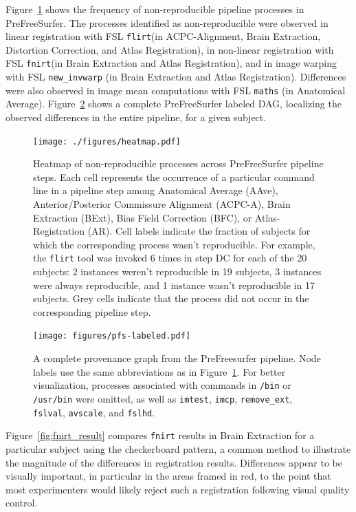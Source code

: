\documentclass[a4paper,num-refs]{oup-contemporary}
\newcommand{\revised}[1]{\color{blue}#1\color{black}\xspace}
\newcommand{\flirt}[0]{\texttt{flirt}\xspace}
\newcommand{\fnirt}[0]{\texttt{fnirt}\xspace}
\begin{document}
Figure~\ref{fig:pfs_heatmap} shows the frequency of non-reproducible pipeline processes
in PreFreeSurfer.
The processes identified as non-reproducible were observed in linear registration
with FSL \flirt (in ACPC-Alignment, Brain Extraction, Distortion Correction, and
Atlas Registration), in non-linear registration with FSL \fnirt (in Brain Extraction
and Atlas Registration), and in image warping with FSL \texttt{new\_invwarp} (in Brain Extraction
and Atlas Registration). Differences were also observed in image mean
computations with FSL \texttt{maths}  (in Anatomical Average).
Figure~\ref{fig:complete_pfs} shows a complete PreFreeSurfer labeled DAG, localizing
the observed differences in the entire pipeline, for a given subject.
\begin{figure}
\centering
  \texttt{[image: ./figures/heatmap.pdf]}
  \caption{Heatmap of non-reproducible processes across PreFreeSurfer pipeline steps.
  Each cell represents the occurrence of a particular command line in a
  pipeline step among Anatomical Average (AAve), Anterior/Posterior
  Commissure Alignment (ACPC-A), Brain Extraction (BExt), Bias Field
  Correction (BFC), or Atlas-Registration (AR). Cell labels indicate the
  fraction of subjects for which the corresponding process wasn't reproducible. For example,
  the \flirt tool was invoked 6 times in step DC for each of the 20
  subjects: 2 instances weren't reproducible in 19 subjects, 3
  instances were always reproducible, and 1 instance wasn't reproducible in
  17 subjects.
  \revised{Grey cells indicate that the process did not occur in the corresponding pipeline step.}}
  \label{fig:pfs_heatmap}
\end{figure}

\begin{figure}
   \centering
    \texttt{[image: figures/pfs-labeled.pdf]}
    \caption{A complete provenance graph from the PreFreesurfer pipeline.
    \revised{Node labels use the same abbreviations as in Figure~\ref{fig:pfs_heatmap}.}
    For better visualization, processes associated with commands
    in \texttt{/bin} or \texttt{/usr/bin} were omitted, as well as
  \texttt{imtest}, \texttt{imcp}, \texttt{remove\_ext}, \texttt{fslval}, \texttt{avscale}, and \texttt{fslhd}.}
    \label{fig:complete_pfs}
\end{figure}

\revised{
Figure~\ref{fig:fnirt_result} compares \fnirt results in Brain Extraction
for a particular subject using the checkerboard pattern,
a common method to illustrate the magnitude of the differences in registration results.
Differences appear to be visually important, in particular in the areas framed in red, 
to the point that most experimenters would likely reject such a registration following visual quality control.}
\end{document}
